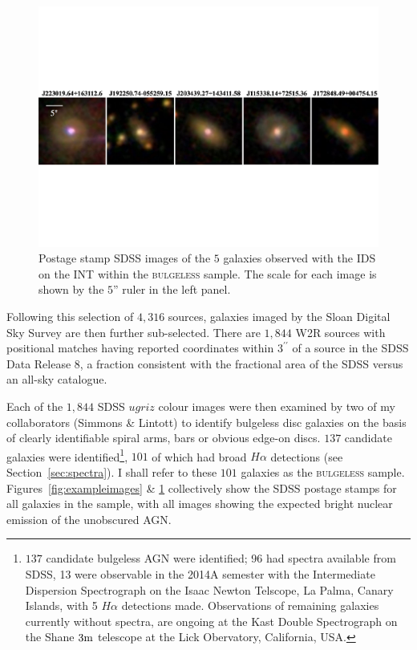 \begin{figure}
\centering
\includegraphics[width=\textwidth]{agn/mosaic_INT_gal_only.pdf}
\caption[SDSS images of 5 galaxies observed with the IDS on the INT]{Postage stamp SDSS images of the $5$ galaxies observed with the IDS on the INT within the \textsc{bulgeless} sample. The scale for each image is shown by the $5$'' ruler in the left panel.}
\label{fig:INTimages}
\end{figure}


Following this selection of $4,316$ sources, galaxies imaged by the Sloan Digital Sky Survey are then further sub-selected. There are $1,844$ W2R sources with positional matches having reported coordinates within $3^{\prime \prime}$ of a source in the SDSS \citep{york00} Data Release 8, a fraction consistent with the fractional area of the SDSS versus an all-sky catalogue. %

Each of the $1, 844$ SDSS $ugriz$ colour images were then examined by two of my collaborators (Simmons \& Lintott) to identify bulgeless disc galaxies on the basis of clearly identifiable spiral arms, bars or obvious edge-on discs. $137$ candidate galaxies were identified\footnote{$137$ candidate bulgeless AGN were identified; 96 had spectra available from SDSS, 13 were observable in the 2014A semester with the Intermediate Dispersion Spectrograph on the Isaac Newton Telscope, La Palma, Canary Islands, with 5 $H\alpha$ detections made. Observations of remaining galaxies currently without spectra, are ongoing at the Kast Double Spectrograph on the Shane $3\rm{m}$ telescope at the Lick Obervatory, California, USA.}, $101$ of which had broad $H\alpha$ detections (see Section~\ref{sec:spectra}). I shall refer to these $101$ galaxies as the \textsc{bulgeless} sample. Figures~\ref{fig:exampleimages} \& \ref{fig:INTimages} collectively show the SDSS postage stamps for all galaxies in the sample, with all images showing the expected bright nuclear emission of the unobscured AGN. 

